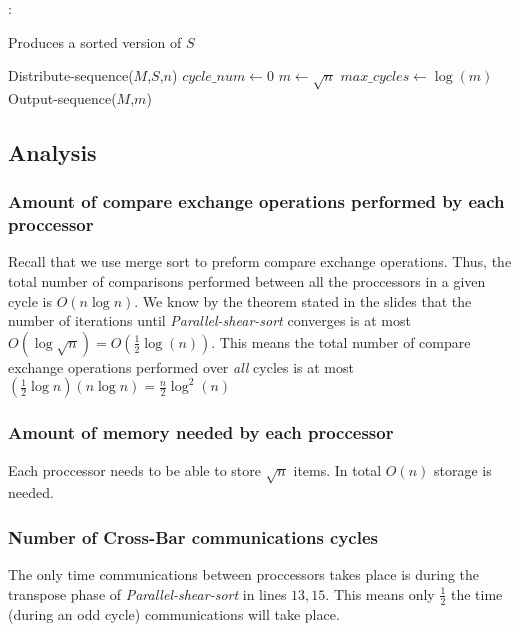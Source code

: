 \documentclass[12pt]{article}
\begin{document}
\begin{algorithm}[]
	:
	\SetAlgoLined
	\DontPrintSemicolon
	\LinesNumbered 
	\caption{Produces a sorted version of $S$}
	Distribute-sequence($M$,$S$,$n$) \;
	$cycle\_num \leftarrow 0$ \;
	$m \leftarrow \sqrt{n}$ \;
	$max\_cycles \leftarrow \log(m)$ \;
	Output-sequence($M$,$m$)\;
\end{algorithm}
\newpage

\subsection{Analysis}
\subsubsection{Amount of compare exchange operations performed by each proccessor} \label{exchange}
Recall that we use merge sort to preform compare exchange operations.
Thus, the total number of comparisons performed between all the proccessors 
in a given cycle is $O(n \log n)$. We know by the theorem stated in the slides that the number of
iterations until \textit{Parallel-shear-sort} converges is at most 
$O(\log\sqrt{n}) = O(\frac1{2}\log(n))$. 
This means the total number of compare exchange operations 
performed over \textit{all} cycles is at most \\
$(\frac1{2}\log n)(n \log n) = \frac{n}{2}\log^2(n)$

\subsubsection{Amount of memory needed by each proccessor}
Each proccessor needs to be able to store $\sqrt{n}$ items. In total $O(n)$ storage
is needed.

\subsubsection{Number of Cross-Bar communications cycles }
The only time communications between proccessors takes place is during the transpose
phase of \textit{Parallel-shear-sort} in lines $13,15$. This means only $\frac1{2}$
the time (during an odd cycle) communications will take place. \\ 
\end{document}
